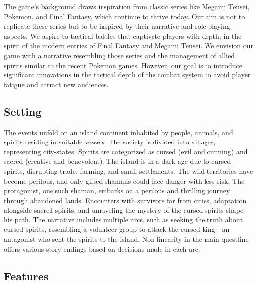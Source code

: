 \documentclass[a4paper,10pt,english]{article}
\begin{document}
The game's background draws inspiration from classic series like Megami Tensei, Pokemon, and Final Fantasy, which continue to thrive today. Our aim is not to replicate these series but to be inspired by their narrative and role-playing aspects. We aspire to tactical battles that captivate players with depth, in the spirit of the modern entries of Final Fantasy and Megami Tensei. We envision our game with a narrative resembling those series and the management of allied spirits similar to the recent Pokemon games. However, our goal is to introduce significant innovations in the tactical depth of the combat system to avoid player fatigue and attract new audiences.

\subsection*{Setting}
The events unfold on an island continent inhabited by people, animals, and spirits residing in suitable vessels. The society is divided into villages, representing city-states. Spirits are categorized as cursed (evil and cunning) and sacred (creative and benevolent). The island is in a dark age due to cursed spirits, disrupting trade, farming, and small settlements. The wild territories have become perilous, and only gifted shamans could face danger with less risk. The protagonist, one such shaman, embarks on a perilous and thrilling journey through abandoned lands. Encounters with survivors far from cities, adaptation alongside sacred spirits, and unraveling the mystery of the cursed spirits shape his path. The narrative includes multiple arcs, such as seeking the truth about cursed spirits, assembling a volunteer group to attack the cursed king—an antagonist who sent the spirits to the island. Non-linearity in the main questline offers various story endings based on decisions made in each arc.

\subsection*{Features}
\end{document}
